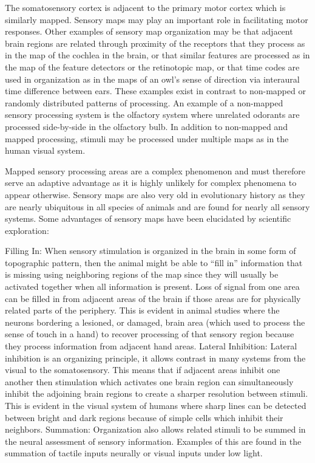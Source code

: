 The somatosensory cortex is adjacent to the primary motor cortex which is similarly mapped. Sensory maps may play an important role in facilitating motor responses. Other examples of sensory map organization may be that adjacent brain regions are related through proximity of the receptors that they process as in the map of the cochlea in the brain, or that similar features are processed as in the map of the feature detectors or the retinotopic map, or that time codes are used in organization as in the maps of an owl's sense of direction via interaural time difference between ears. These examples exist in contrast to non-mapped or randomly distributed patterns of processing. An example of a non-mapped sensory processing system is the olfactory system where unrelated odorants are processed side-by-side in the olfactory bulb. In addition to non-mapped and mapped processing, stimuli may be processed under multiple maps as in the human visual system.

Mapped sensory processing areas are a complex phenomenon and must therefore serve an adaptive advantage as it is highly unlikely for complex phenomena to appear otherwise. Sensory maps are also very old in evolutionary history as they are nearly ubiquitous in all species of animals and are found for nearly all sensory systems. Some advantages of sensory maps have been elucidated by scientific exploration:

Filling In: When sensory stimulation is organized in the brain in some form of topographic pattern, then the animal might be able to ``fill in'' information that is missing using neighboring regions of the map since they will usually be activated together when all information is present. Loss of signal from one area can be filled in from adjacent areas of the brain if those areas are for physically related parts of the periphery. This is evident in animal studies where the neurons bordering a lesioned, or damaged, brain area (which used to process the sense of touch in a hand) to recover processing of that sensory region because they process information from adjacent hand areas.
Lateral Inhibition: Lateral inhibition is an organizing principle, it allows contrast in many systems from the visual to the somatosensory. This means that if adjacent areas inhibit one another then stimulation which activates one brain region can simultaneously inhibit the adjoining brain regions to create a sharper resolution between stimuli. This is evident in the visual system of humans where sharp lines can be detected between bright and dark regions because of simple cells which inhibit their neighbors.
Summation: Organization also allows related stimuli to be summed in the neural assessment of sensory information. Examples of this are found in the summation of tactile inputs neurally or visual inputs under low light.

